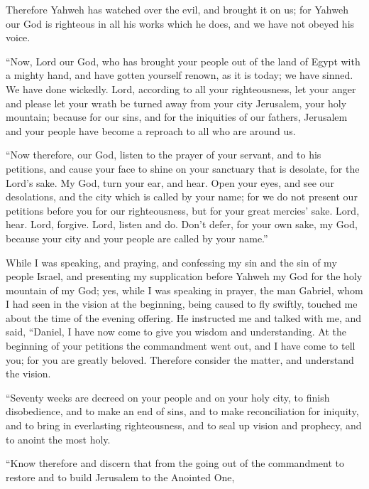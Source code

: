 {Therefore Yahweh has watched over the evil, and brought it on us; for Yahweh our God is righteous in all his works which he does, and we have not obeyed his voice.
\par }{\PI {}“Now, Lord our God, who has brought your people out of the land of Egypt with a mighty hand, and have gotten yourself renown, as it is today; we have sinned. We have done wickedly.
Lord, according to all your righteousness, let your anger and please let your wrath be turned away from your city Jerusalem, your holy mountain; because for our sins, and for the iniquities of our fathers, Jerusalem and your people have become a reproach to all who are around us.
\par }{\PI {}“Now therefore, our God, listen to the prayer of your servant, and to his petitions, and cause your face to shine on your sanctuary that is desolate, for the Lord’s sake.
My God, turn your ear, and hear. Open your eyes, and see our desolations, and the city which is called by your name; for we do not present our petitions before you for our righteousness, but for your great mercies’ sake.
Lord, hear. Lord, forgive. Lord, listen and do. Don’t defer, for your own sake, my God, because your city and your people are called by your name.”
\par }{\BB \par }{\PP {}While I was speaking, and praying, and confessing my sin and the sin of my people Israel, and presenting my supplication before Yahweh my God for the holy mountain of my God;
yes, while I was speaking in prayer, the man Gabriel, whom I had seen in the vision at the beginning, being caused to fly swiftly, touched me about the time of the evening offering.
He instructed me and talked with me, and said, “Daniel, I have now come to give you wisdom and understanding.
At the beginning of your petitions the commandment went out, and I have come to tell you; for you are greatly beloved. Therefore consider the matter, and understand the vision.
\par }{\PP {}“Seventy weeks are decreed on your people and on your holy city, to finish disobedience, and to make an end of sins, and to make reconciliation for iniquity, and to bring in everlasting righteousness, and to seal up vision and prophecy, and to anoint the most holy.
\par }{\PP {}“Know therefore and discern that from the going out of the commandment to restore and to build Jerusalem to the Anointed One,}
